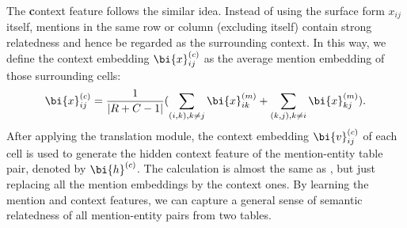 The \textbf{c}ontext feature follows the similar idea.
Instead of using the surface form $x_{ij}$ itself,
mentions in the same row or column (excluding itself) contain strong relatedness
and hence be regarded as the surrounding context.
In this way, we define the context embedding $\bi{x}_{ij}^{(c)}$
as the average mention embedding of those surrounding cells:
\begin{equation}
    \bi{x}_{ij}^{(c)} = \frac{1}{|R+C-1|}(
      \sum_{(i,k), k \neq j} \bi{x}_{ik}^{(m)} +
      \sum_{(k,j), k \neq i} \bi{x}_{kj}^{(m)}
    ).
\end{equation}
\noindent
After applying the translation module,
the context embedding $\bi{v}_{ij}^{(c)}$ of each cell is used to generate
the hidden context feature of the mention-entity table pair, denoted by $\bi{h}^{(c)}$.
The calculation is almost the same as ,
but just replacing all the mention embeddings by the context ones.
By learning the mention and context features,
we can capture a general sense of semantic relatedness of all mention-entity pairs from two tables.



